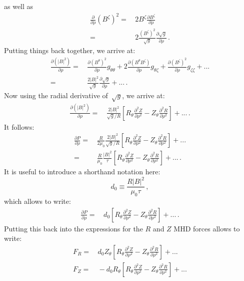 as well as
\begin{align}
 \frac{\partial}{\partial \rho} (B^\zeta)^2
 =&\, 2 B^\zeta \frac{\partial B^\zeta}{\partial \rho} \nonumber \\
 =&\, 2 \frac{(B^\zeta)^2}{\sqrt{g}}
       \frac{\partial \sqrt{g}}{\partial \rho} \, .
\end{align}
%
Putting things back together, we arrive at:
\begin{align}
 \frac{\partial (|B|^2)}{\partial \rho}
 =&\,     \frac{\partial (B^\theta)^2      }{\partial \rho} g_{\theta \theta}
      + 2 \frac{\partial (B^\theta B^\zeta)}{\partial \rho} g_{\theta \zeta }
      +   \frac{\partial (B^\zeta)^2       }{\partial \rho} g_{\zeta  \zeta } + ... \nonumber \\
 =&\, \frac{2 |B|^2}{\sqrt{g}} \frac{\partial \sqrt{g}}{\partial \rho} + ... \, .
\end{align}
%
Now using the radial derivative of~$\sqrt{g}$,
we arrive at:
\begin{align}
 \frac{\partial (|B|^2)}{\partial \rho}
 =&\, \frac{2 |B|^2}{\sqrt{g} / R}
      \left[   R_\theta \frac{\partial^2 Z}{\partial \rho^2}
             - Z_\theta \frac{\partial^2 R}{\partial \rho^2} \right] + ... \, .
\end{align}
It follows:
\begin{align}
 \frac{\partial P}{\partial \rho}
 =&\, \frac{R}{2 \mu_0}
      \frac{2 |B|^2}{\sqrt{g} / R}
      \left[   R_\theta \frac{\partial^2 Z}{\partial \rho^2}
             - Z_\theta \frac{\partial^2 R}{\partial \rho^2} \right] + ... \nonumber \\
 =&\, \frac{R}{\mu_0}
      \frac{|B|^2}{\tau}
      \left[   R_\theta \frac{\partial^2 Z}{\partial \rho^2}
             - Z_\theta \frac{\partial^2 R}{\partial \rho^2} \right] + ... \, .
\end{align}
It is useful to introduce a shorthand notation here:
\begin{equation}
 d_0 \equiv \frac{R |B|^2}{\mu_0 \tau} \, ,
\end{equation}
which allows to write:
\begin{align}
 \frac{\partial P}{\partial \rho}
 =&\, d_0
      \left[   R_\theta \frac{\partial^2 Z}{\partial \rho^2}
             - Z_\theta \frac{\partial^2 R}{\partial \rho^2} \right] + ... \, .
\end{align}
Putting this back into the expressions
for the $R$ and $Z$ MHD forces allows to write:
\begin{align}
 F_R =&\,  d_0 Z_\theta \left[   R_\theta \frac{\partial^2 Z}{\partial \rho^2}
                               - Z_\theta \frac{\partial^2 R}{\partial \rho^2} \right] + ... \\
 F_Z =&\, -d_0 R_\theta \left[   R_\theta \frac{\partial^2 Z}{\partial \rho^2}
                               - Z_\theta \frac{\partial^2 R}{\partial \rho^2} \right] + ...
\end{align}

